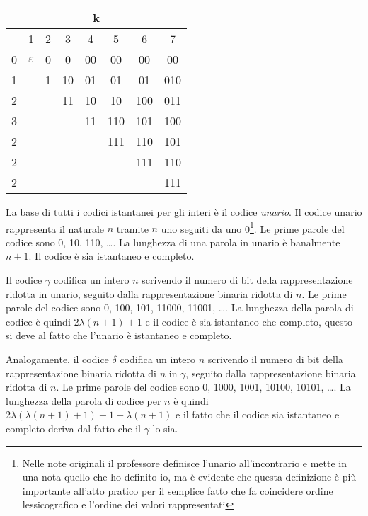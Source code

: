 \begin{table}[ht]
    \centering
    \begin{tabular}{|c||c|c|c|c|c|c|c|}
      \hline
      \multicolumn{8}{|c|}{k} \\
      \hline
       &1 &2 &3 &4 &5 &6  &7 \\
      \hline
      0 &$\varepsilon$ &0 &0 &00 &00 &00 &00 \\
      1 & &1 &10 &01 &01 &01 &010 \\
      2 & & &11 &10 &10 &100 &011 \\
      3 & & & &11 &110 &101 &100 \\
      2 & & & & &111 &110 &101 \\
      2 & & & & & &111 &110 \\
      2 & & & & & & &111 \\
      \hline
    \end{tabular}
\end{table}
\noindent La base di tutti i codici istantanei per gli interi è il codice \textit{unario}. Il codice unario rappresenta il naturale $n$ tramite $n$ uno seguiti da uno 0\footnote{Nelle note originali il professore definisce l'unario all'incontrario e mette in una nota quello che ho definito io, ma è evidente che questa definizione è più importante all'atto pratico per il semplice fatto che fa coincidere ordine lessicografico e l'ordine dei valori rappresentati}. Le prime parole del codice sono 0, 10, 110, \dots. La lunghezza di una parola in unario è banalmente $n + 1$. Il codice è sia istantaneo e completo.

Il codice $\gamma$ \cite{elias} codifica un intero $n$ scrivendo il numero di bit della rappresentazione ridotta in unario, seguito dalla rappresentazione binaria ridotta di $n$. Le prime parole del codice sono 0, 100, 101, 11000, 11001, \dots. La lunghezza della parola di codice è quindi $2\lambda(n + 1) + 1$ e il codice è sia istantaneo che completo, questo si deve al fatto che l'unario è istantaneo e completo.

Analogamente, il codice $\delta$ \cite{elias} codifica un intero $n$ scrivendo il numero di bit della rappresentazione binaria ridotta di $n$ in $\gamma$, seguito dalla rappresentazione binaria ridotta di $n$. Le prime parole del codice sono 0, 1000, 1001, 10100, 10101, \dots. La lunghezza della parola di codice per $n$ è quindi $2\lambda(\lambda(n + 1) + 1) + 1 + \lambda(n + 1)$ e il fatto che il codice sia istantaneo e completo deriva dal fatto che il $\gamma$ lo sia.

